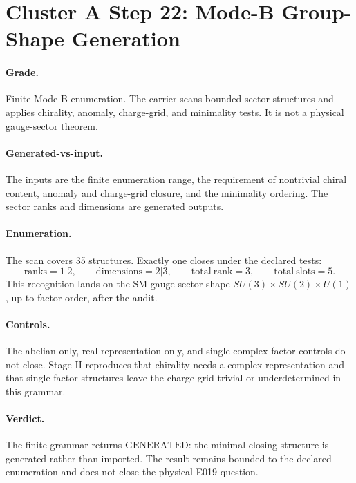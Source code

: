 \section*{Cluster A Step 22: Mode-B Group-Shape Generation}

\paragraph{Grade.}
Finite Mode-B enumeration. The carrier scans bounded sector structures and applies chirality, anomaly, charge-grid, and minimality tests. It is not a physical gauge-sector theorem.

\paragraph{Generated-vs-input.}
The inputs are the finite enumeration range, the requirement of nontrivial chiral content, anomaly and charge-grid closure, and the minimality ordering. The sector ranks and dimensions are generated outputs.

\paragraph{Enumeration.}
The scan covers 35 structures. Exactly one closes under the declared tests:
\[
  \mathrm{ranks}=1|2,\qquad \mathrm{dimensions}=2|3,\qquad
  \mathrm{total\ rank}=3,\qquad \mathrm{total\ slots}=5.
\]
This recognition-lands on the SM gauge-sector shape \(SU(3)\times SU(2)\times U(1)\), up to factor order, after the audit.

\paragraph{Controls.}
The abelian-only, real-representation-only, and single-complex-factor controls do not close. Stage II reproduces that chirality needs a complex representation and that single-factor structures leave the charge grid trivial or underdetermined in this grammar.

\paragraph{Verdict.}
The finite grammar returns \(\mathrm{GENERATED}\): the minimal closing structure is generated rather than imported. The result remains bounded to the declared enumeration and does not close the physical E019 question.
